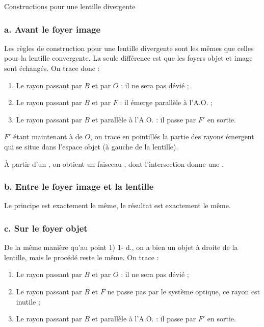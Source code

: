 \documentclass[10pt,a5paper,notitlepage]{book}
\begin{document}
\begin{center}
    \huge Constructions pour une lentille divergente
\end{center}

\setcounter{subsubsection}{0}
\subsubsection{a. Avant le foyer image}
Les règles de construction pour une lentille divergente sont les mêmes que
celles pour la lentille convergente. La seule différence est que les foyers
objet et image sont échangés. On trace donc :

\begin{enumerate}
    \item Le rayon passant par $B$ et par $O$ : il ne sera pas dévié ;
    \item Le rayon passant par $B$ et par $F$ : il émerge parallèle à l'A.O. ;
    \item Le rayon passant par $B$ et parallèle à l'A.O. : il passe par $F'$ en
        sortie.
\end{enumerate}

$F'$ étant maintenant à  de $O$, on trace en pointillés la partie des
rayons émergent qui se situe dans l'espace objet (à gauche de la lentille).
\bigbreak

À partir d'un , on obtient un faisceau , dont
l'intersection donne une .

\setcounter{subsubsection}{0}
\subsubsection{b. Entre le foyer image et la lentille}
Le principe est exactement le même, le résultat est exactement le même.

\setcounter{subsubsection}{0}
\subsubsection{c. Sur le foyer objet}
De la même manière qu'au point \textcolor{capri}{1) 1- d.}, on a bien un objet à
droite de la lentille, mais le procédé reste le même. On trace :

\begin{enumerate}
    \item Le rayon passant par $B$ et par $O$ : il ne sera pas dévié ;
    \item Le rayon passant par $B$ et $F$ ne passe pas par le système optique,
        ce rayon est inutile ;
    \item Le rayon passant par $B$ et parallèle à l'A.O. : il passe par $F'$ en
        sortie.
\end{enumerate}
\end{document}
